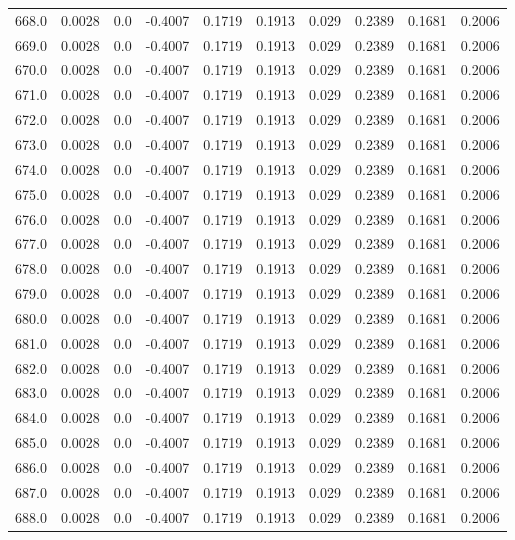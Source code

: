 \begin{longtable}{lrrrrrrrrr}
668.0 & 0.0028 & 0.0 & -0.4007 & 0.1719 & 0.1913 & 0.029 & 0.2389 & 0.1681 & 0.2006 \\
669.0 & 0.0028 & 0.0 & -0.4007 & 0.1719 & 0.1913 & 0.029 & 0.2389 & 0.1681 & 0.2006 \\
670.0 & 0.0028 & 0.0 & -0.4007 & 0.1719 & 0.1913 & 0.029 & 0.2389 & 0.1681 & 0.2006 \\
671.0 & 0.0028 & 0.0 & -0.4007 & 0.1719 & 0.1913 & 0.029 & 0.2389 & 0.1681 & 0.2006 \\
672.0 & 0.0028 & 0.0 & -0.4007 & 0.1719 & 0.1913 & 0.029 & 0.2389 & 0.1681 & 0.2006 \\
673.0 & 0.0028 & 0.0 & -0.4007 & 0.1719 & 0.1913 & 0.029 & 0.2389 & 0.1681 & 0.2006 \\
674.0 & 0.0028 & 0.0 & -0.4007 & 0.1719 & 0.1913 & 0.029 & 0.2389 & 0.1681 & 0.2006 \\
675.0 & 0.0028 & 0.0 & -0.4007 & 0.1719 & 0.1913 & 0.029 & 0.2389 & 0.1681 & 0.2006 \\
676.0 & 0.0028 & 0.0 & -0.4007 & 0.1719 & 0.1913 & 0.029 & 0.2389 & 0.1681 & 0.2006 \\
677.0 & 0.0028 & 0.0 & -0.4007 & 0.1719 & 0.1913 & 0.029 & 0.2389 & 0.1681 & 0.2006 \\
678.0 & 0.0028 & 0.0 & -0.4007 & 0.1719 & 0.1913 & 0.029 & 0.2389 & 0.1681 & 0.2006 \\
679.0 & 0.0028 & 0.0 & -0.4007 & 0.1719 & 0.1913 & 0.029 & 0.2389 & 0.1681 & 0.2006 \\
680.0 & 0.0028 & 0.0 & -0.4007 & 0.1719 & 0.1913 & 0.029 & 0.2389 & 0.1681 & 0.2006 \\
681.0 & 0.0028 & 0.0 & -0.4007 & 0.1719 & 0.1913 & 0.029 & 0.2389 & 0.1681 & 0.2006 \\
682.0 & 0.0028 & 0.0 & -0.4007 & 0.1719 & 0.1913 & 0.029 & 0.2389 & 0.1681 & 0.2006 \\
683.0 & 0.0028 & 0.0 & -0.4007 & 0.1719 & 0.1913 & 0.029 & 0.2389 & 0.1681 & 0.2006 \\
684.0 & 0.0028 & 0.0 & -0.4007 & 0.1719 & 0.1913 & 0.029 & 0.2389 & 0.1681 & 0.2006 \\
685.0 & 0.0028 & 0.0 & -0.4007 & 0.1719 & 0.1913 & 0.029 & 0.2389 & 0.1681 & 0.2006 \\
686.0 & 0.0028 & 0.0 & -0.4007 & 0.1719 & 0.1913 & 0.029 & 0.2389 & 0.1681 & 0.2006 \\
687.0 & 0.0028 & 0.0 & -0.4007 & 0.1719 & 0.1913 & 0.029 & 0.2389 & 0.1681 & 0.2006 \\
688.0 & 0.0028 & 0.0 & -0.4007 & 0.1719 & 0.1913 & 0.029 & 0.2389 & 0.1681 & 0.2006 \\

\end{longtable}
